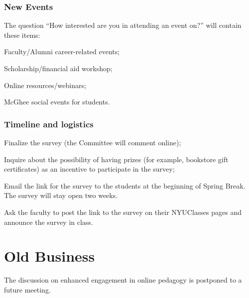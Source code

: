 \documentclass[10pt]{meetingmins}
\begin{document}
\subsubsection{New Events} The question ``How interested are you in attending an event on?''  will contain these items:
\begin{subsubitems}
\item Faculty/Alumni career-related events;
\item Scholarship/financial aid workshop;
\item Online resources/webinars;
\item McGhee social events for students.
\end{subsubitems}
\subsubsection{Timeline and logistics}
\begin{subsubitems}
\item Finalize the survey (the Committee  will comment online);
\item Inquire about the possibility of having prizes (for example, bookstore gift certificates) as an incentive to participate in the survey;
\item Email the link for the survey to the students at the beginning of Spring Break. The survey will stay open two weeks.
\item Ask the faculty to post the link to the survey on their NYUClasses pages and announce the survey in class.
\end{subsubitems} 




\section{Old Business}
\begin{items}
\item The discussion on enhanced engagement in online pedagogy is postponed to a future meeting.
\item \priormins
\end{items}
\vspace{1em}
\end{document}
